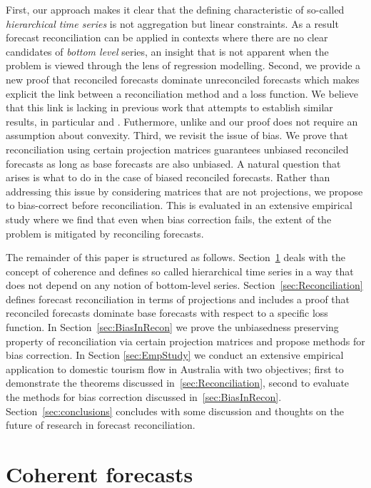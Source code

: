 \documentclass[12pt]{article}
\theoremstyle{definition}
\begin{document}
	First, our approach makes it clear that the defining characteristic of so-called {\em hierarchical time series} is not aggregation but linear constraints.  As a result forecast reconciliation can be applied in contexts where there are no clear candidates of {\em bottom level} series, an insight that is not apparent when the problem is viewed through the lens of regression modelling.  Second, we provide a new proof that reconciled forecasts dominate unreconciled forecasts which makes explicit the link between a reconciliation method and a loss function.  We believe that this link is lacking in previous work that attempts to establish similar results, in particular \cite{VanErven2015a} and \cite{WicEtAl2019}.  Futhermore, unlike \cite{VanErven2015a} and \cite{WicEtAl2019} our proof does not require an assumption about convexity.  Third, we revisit the issue of bias.  We prove that reconciliation using certain projection matrices guarantees unbiased reconciled forecasts as long as base forecasts are also unbiased.  A natural question that arises is what to do in the case of biased reconciled forecasts.  Rather than addressing this issue by considering matrices that are not projections, we propose to bias-correct before reconciliation.  This is evaluated in an extensive empirical study where we find that even when bias correction fails, the extent of the problem is mitigated by reconciling forecasts.
	
	
	The remainder of this paper is structured as follows. Section~\ref{sec:CoheForecasts} deals with the concept of coherence and defines so called hierarchical time series in a way that does not depend on any notion of bottom-level series.  Section~\ref{sec:Reconciliation} defines forecast reconciliation in terms of projections and includes a proof that reconciled forecasts dominate base forecasts with respect to a specific loss function. In Section~\ref{sec:BiasInRecon} we prove the unbiasedness preserving property of reconciliation via certain projection matrices and propose methods for bias correction. In Section \ref{sec:EmpStudy} we conduct an extensive empirical application to domestic tourism flow in Australia with two objectives; first to demonstrate the theorems discussed in~\ref{sec:Reconciliation}, second to evaluate the methods for bias correction discussed in~\ref{sec:BiasInRecon}.  Section~\ref{sec:conclusions} concludes with some discussion and thoughts on the  future of research in forecast reconciliation.
\section{Coherent forecasts}\label{sec:CoheForecasts}
	
\end{document}
